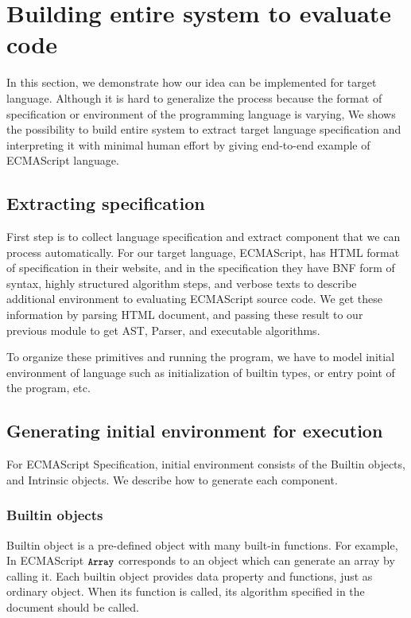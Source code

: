 \section{Building entire system to evaluate code}\label{sec:framework}

In this section, we demonstrate how our idea can be implemented for target language. Although it is hard to generalize the process because the format of specification or
environment of the programming language is varying, We shows the possibility to build entire system to extract target language specification and interpreting it with minimal human effort by giving end-to-end example of ECMAScript language.

\subsection{Extracting specification}
First step is to collect language specification and extract component that we can process automatically. For our target language, ECMAScript, has HTML format of specification in their website, and
in the specification they have BNF form of syntax, highly structured algorithm steps, and verbose texts to describe additional environment to evaluating ECMAScript source code.
We get these information by parsing HTML document, and passing these result to our previous module to get AST, Parser, and executable algorithms.

To organize these primitives and running the program, we have to model initial environment of language such as initialization of builtin types, or entry point of the program, etc.

\subsection{Generating initial environment for execution}
For ECMAScript Specification, initial environment consists of the Builtin objects, and Intrinsic objects. We describe how to generate each component.

\subsubsection{Builtin objects}

 Builtin object is a pre-defined object with many built-in functions. For example, In ECMAScript \( \texttt{\small Array} \) corresponds to an object which can generate an array by
 calling it. Each builtin object provides data property and functions, just as ordinary object. When its function is called,
 its algorithm specified in the document should be called.
 
